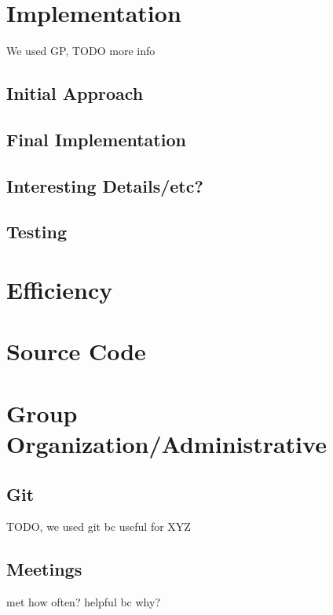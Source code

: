 \documentclass[titlepage]{article}
\begin{document}
	\section{Implementation}
	We used GP, TODO more info
	
		\subsection{Initial Approach}
	
		\subsection{Final Implementation}
	
		\subsection{Interesting Details/etc?}
	
		\subsection{Testing}
	
	\section{Efficiency}
	
	\section{Source Code}
	
	\section{Group Organization/Administrative}
	
		\subsection{Git}
		TODO, we used git bc useful for XYZ

		\subsection{Meetings}
		met how often? helpful bc why?
	
\end{document}
